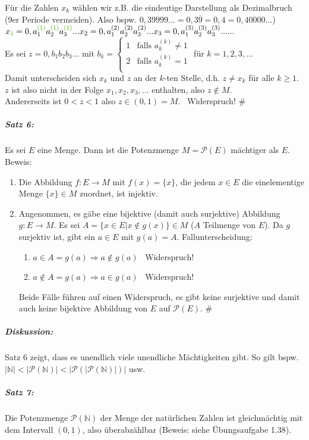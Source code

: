 Für die Zahlen $x_k$ wählen wir z.B. die eindeutige Darstellung als Dezimalbruch (9er Periode vermeiden). Also bspw. $0,39999...=0,3\overline{9}=0,4=0,40000...$)\\
$x_{\textcolor{green}{1}}=0,a_1^{\textcolor{green}{(1)}}a_2^{\textcolor{green}{(1)}}a_3^{\textcolor{green}{(1)}}...\\
x_2=0,a_1^{(2)}a_2^{(2)}a_3^{(2)}...\\
x_3=0,a_1^{(3)}a_2^{(3)}a_3^{(3)}...\\
...$\\
Es sei $z=0,b_1 b_2 b_3 ...$ mit 
$b_k=\begin{cases} 
1 & \text{falls } a_k^{(k)}\not = 1\\
2 & \text{falls } a_k^{(k)} = 1\\
\end{cases}$
für $k=1,2,3,...$\\
Damit unterscheiden sich $x_k$ und $z$ an der $k$-ten Stelle, d.h. $z \not = x_k$ für alle $k\geq 1$. $z$ ist also nicht in der Folge $x_1, x_2, x_3, ...$ enthalten, also \emph{$z\not \in M$}.\\
Andererseits ist $0<z<1$ also \emph{$z\in (0,1) = M$}. \lightning\, Widerspruch! \#

\subparagraph{Satz 6:} \parskp
Es sei $E$ eine Menge. Dann ist die Potenzmenge $M=\mathcal{P}(E)$ mächtiger als $E$.\\
Beweis: 
\begin{enumerate}
\item Die Abbildung $f: E \rightarrow M$ mit $f(x)=\{x\}$, die jedem $x \in E$ die einelementige Menge $\{x\}\in M$ zuordnet, ist injektiv.
\item Angenommen, es gäbe eine bijektive (damit auch surjektive) Abbildung $g: E \rightarrow M$. Es sei $A = \{x \in E| x \not \in g (x)\}\in M$ ($A$ Teilmenge von $E$). Da $g$ surjektiv ist, gibt ein $a \in E$ mit $g(a)=A$. Fallunterscheidung:
\begin{enumerate} %
\item $a\in A= g(a) \Rightarrow a \not \in g(a)$ \lightning\, Widerspruch!
\item $a \not \in A =g(a) \Rightarrow a \in g(a)$ \lightning\, Widerspruch!
\end{enumerate}
Beide Fälle führen auf einen Widerspruch, es gibt keine surjektive und damit auch keine bijektive Abbildung von $E$ auf $\mathcal{P}(E)$. \#
\end{enumerate}

\subparagraph{Diskussion:}\parskp
Satz 6 zeigt, dass es unendlich viele unendliche Mächtigkeiten gibt. So gilt bspw. $|\mathbb{N}|<|\mathcal{P}(\mathbb{N})|<|\mathcal{P}(|\mathcal{P}(\mathbb{N})|)|$ usw. 

\subparagraph{Satz 7:} \parskp
Die Potenzmenge $\mathcal{P}(\mathbb{N})$ der Menge der natürlichen Zahlen ist gleichmächtig mit dem Intervall $(0,1)$, also überabzählbar (Beweis: siehe Übungsaufgabe 1.38).

